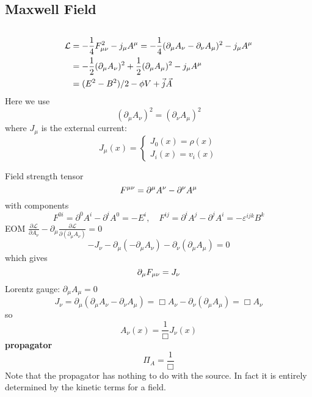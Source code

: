 \subsection{Maxwell Field}
\begin{equation}
    \label{Maxwell Eqn}
\end{equation}

\[ 
\begin{aligned}
    \mathcal{L} &= -\frac{1}{4}F^2_{\mu\nu} - j_{\mu}A^{\mu} 
    =-\frac{1}{4}(\partial_{\mu}A_\nu-\partial_{\nu}A_\mu)^2-j_{\mu}A^{\mu}\\
    &=-\frac{1}{2}(\partial_{\mu}A_\nu)^2+\frac{1}{2}(\partial_{\mu}A_\mu)^2-j_{\mu}A^{\mu}\\
    &=(E^2 - B^2)/2 - \phi V + \vec{j}\vec{A} 
\end{aligned}
    \]
Here we use
\[
    (\partial_{\mu}A_\nu)^2=(\partial_{\nu}A_\mu)^2
    \]
where $J_\mu$ is the external current:
\[ J_\mu(x) = \left\{ 
\begin{aligned}
    J_0(x) = \rho(x) \\
    J_i(x) = v_i(x)
\end{aligned}
\right.\]

Field strength tensor 
\[ F^{\mu\nu} = \partial^{\mu}A^{\nu} - \partial^{\nu}A^{\mu} \] 
with components 
\[ F^{0i} = \partial^{0}A^{i} - \partial^{i}A^{0} = -E^{i}, 
\quad
F^{ij} = \partial^{i}A^{j} - \partial^{j}A^{i} = -\varepsilon^{ijk}B^{k} \]
EOM
$\frac{\partial\mathcal{L}}{\partial{A_\nu}}-\partial_\mu\frac{\partial\mathcal{L}}{\partial(\partial_{\mu}A_\nu)}=0$
\[-J_\nu-\partial_\mu(-\partial_{\mu}A_\nu)-\partial_\nu(\partial_{\mu}A_\mu)=0\]
which gives
\[\partial_{\mu}F_{\mu\nu}=J_\nu\]
Lorentz gauge: $\partial_{\mu}A_{\mu}=0$
\[J_{\nu}=\partial_{\mu}(\partial_{\mu}A_\nu-\partial_{\nu}A_{\mu})=\Box{A_\nu}-\partial_{\nu}(\partial_{\mu}A_{\mu})
=\Box{A_{\nu}}\]
so
\[A_{\nu}(x)=\frac{1}{\Box}J_{\nu}(x)\]
\textbf{propagator}
\[\Pi_A=\frac{1}{\Box}\]
Note that the propagator has nothing to do with the source. In fact it is
entirely determined by the kinetic terms for a field.

